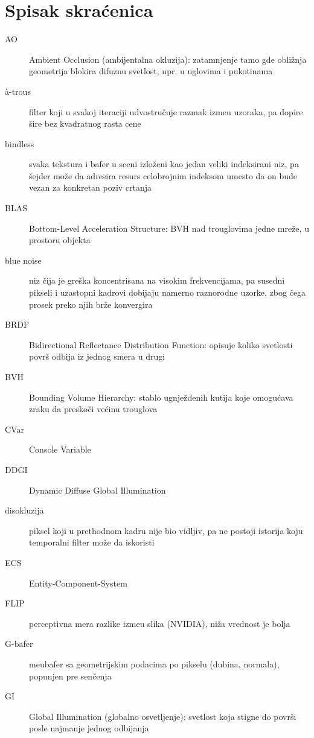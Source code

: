 \chapter*{Spisak skra\'cenica}

\begin{description}
  \item[AO] Ambient Occlusion (ambijentalna okluzija): zatamnjenje tamo gde obli\v{z}nja geometrija
    blokira difuznu svetlost, npr. u uglovima i pukotinama
  \item[\`a-trous] filter koji u svakoj iteraciji udvostru\v{c}uje razmak izme\dj u uzoraka, pa
    dopire \v{s}ire bez kvadratnog rasta cene
  \item[bindless] svaka tekstura i bafer u sceni izlo\v{z}eni kao jedan veliki indeksirani niz, pa
    \v{s}ejder mo\v{z}e da adresira resurs celobrojnim indeksom umesto da on bude vezan za
    konkretan poziv crtanja
  \item[BLAS] Bottom-Level Acceleration Structure: BVH nad trouglovima jedne mre\v{z}e, u prostoru
    objekta
  \item[blue noise] niz \v{c}ija je gre\v{s}ka koncentrisana na visokim frekvencijama, pa susedni
    pikseli i uzastopni kadrovi dobijaju namerno raznorodne uzorke, zbog \v{c}ega prosek preko njih
    br\v{z}e konvergira
  \item[BRDF] Bidirectional Reflectance Distribution Function: opisuje koliko svetlosti povr\v{s}
    odbija iz jednog smera u drugi
  \item[BVH] Bounding Volume Hierarchy: stablo ugnje\v{z}denih kutija koje omogu\'cava zraku da
    presko\v{c}i ve\'cinu trouglova
  \item[CVar] Console Variable
  \item[DDGI] Dynamic Diffuse Global Illumination
  \item[disokluzija] piksel koji u prethodnom kadru nije bio vidljiv, pa ne postoji istorija koju
    temporalni filter mo\v{z}e da iskoristi
  \item[ECS] Entity-Component-System
  \item[FLIP] perceptivna mera razlike izme\dj u slika (NVIDIA), ni\v{z}a vrednost je bolja
  \item[G-bafer] me\dj ubafer sa geometrijskim podacima po pikselu (dubina, normala), popunjen pre
    sen\v{c}enja
  \item[GI] Global Illumination (globalno osvetljenje): svetlost koja stigne do povr\v{s}i posle
    najmanje jednog odbijanja

\end{description}
